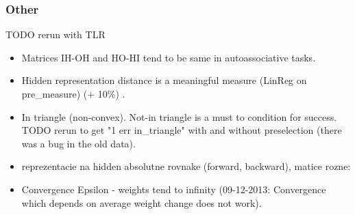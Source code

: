 
\subsubsection{Other}

TODO rerun with TLR 

\begin{itemize} 
\item Matrices IH-OH and HO-HI tend to be same in autoassociative tasks. 
\item Hidden representation distance is a meaningful measure (LinReg on pre\_measure) (+ 10\%) . 
\item In triangle (non-convex). Not-in triangle is a must to condition for success. \\
TODO rerun to get "1 err in\_triangle" with and without preselection (there was a bug in the old data). 
\item reprezentacie na hidden absolutne rovnake (forward, backward), matice rozne:
\item Convergence Epsilon - weights tend to infinity (09-12-2013: Convergence which depends on average weight change does not work). 

\end{itemize}
